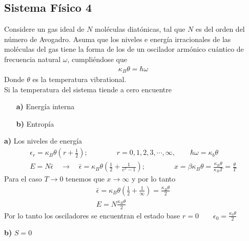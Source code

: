 \documentclass{article}
\begin{document}
\subsection{Sistema Físico 4 }
Considere un gas ideal de $ N  $ moléculas diatónicas, tal que $ N  $ es del orden del número de Avogadro. Asuma que los niveles e energía irracionales de las moléculas del gas tiene la forma de los de un oscilador armónico cuántico de frecuencia natural $ \omega  $, cumpliéndose que 
\begin{gather*}
  \kappa_B \theta = \hbar \omega 
\end{gather*}
Donde $ \theta  $ es la temperatura vibrational. \\
Si la temperatura del sistema tiende a cero encuentre 
\begin{itemize}
  \item[\textbf{a)}] Energía interna 
  \item[\textbf{b)}] Entropía 
\end{itemize}

\hfill 

\hfill 

\textbf{a) } Los niveles de energía 
\begin{gather*}
  \epsilon_r = \kappa_B \theta (r + \frac{1}{2}) ; \qquad \qquad r = 0,1,2,3,\cdots, \infty, \qquad \hbar \omega = \kappa_b \theta \\
  E = N \bar \epsilon \quad \rightarrow \quad \bar \epsilon = \kappa_B \theta \left(\frac{1}{2} + \frac{1}{e ^ {x } - 1 }\right); \qquad \qquad x = \beta \kappa_B \theta = \frac{\kappa_B \theta  }{\kappa_B T } = \frac{\theta }{T }
\end{gather*}
Para el caso $ T \rightarrow 0  $ tenemos que $ x \rightarrow \infty $ y por lo tanto 
\begin{gather*}
  \bar \epsilon = \kappa_B \theta \left(\frac{1}{2} + \frac{1}{\infty}\right) = \frac{\kappa_B \theta }{2 }\\
  E = N \frac{\kappa_B \theta }{2 }
\end{gather*}
Por lo tanto los osciladores se encuentran el estado base $ r = 0 \qquad \epsilon_0 = \frac{\kappa_b \theta }{2 } $ 


\hfill 

\hfill 

\textbf{b) } $ S = 0  $
\end{document}
